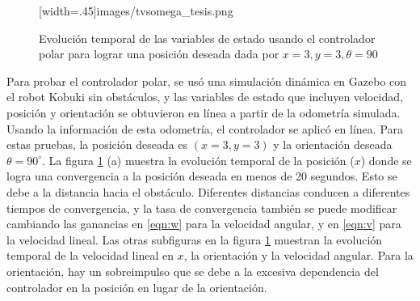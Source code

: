\begin{figure}[ht!]
\begin{center}
{        [width=.45\textwidth]{images/tvsomega_tesis.png}}
    \end{center}
  \captionsetup{font=footnotesize}
    \caption{\label{f:PolarControl}Evolución temporal de las variables de estado usando el controlador polar para lograr una posición deseada dada por $x = 3, y = 3, \theta = 90$}
\end{figure}

Para probar el controlador polar, se usó una simulación dinámica en Gazebo con el robot 
Kobuki sin obstáculos, y las variables de estado que incluyen velocidad, posición y 
orientación se obtuvieron en línea a partir de la odometría simulada. Usando la información 
de esta odometría, el controlador se aplicó en línea. Para estas pruebas, la posición deseada
es $(x = 3, y = 3)$ y la orientación deseada $\theta = 90^{\circ}$. La figura 
\ref{f:PolarControl} (a) muestra la evolución temporal de la posición ($x$) donde 
se logra una convergencia a la posición deseada en menos de 20 segundos. Esto se debe a 
la distancia hacia el obstáculo. Diferentes distancias conducen a diferentes tiempos de 
convergencia, y la tasa de convergencia también se puede modificar cambiando las 
ganancias en \ref{eqn:w} para la velocidad angular, y en \ref{eqn:v} para la velocidad 
lineal. Las otras subfiguras en la figura \ref{f:PolarControl} muestran la evolución 
temporal de la velocidad lineal en $x$, la orientación y la velocidad angular. Para la 
orientación, hay un sobreimpulso que se debe a la excesiva dependencia del controlador 
en la posición en lugar de la orientación.
